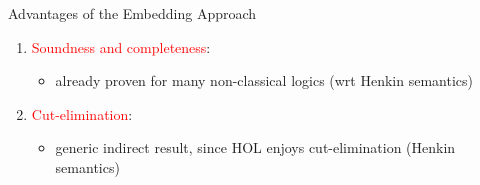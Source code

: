 \documentclass[9pt,mathserif,unknownkeysallowed,xcolor=dvipsnames]{beamer}
\begin{document}
\begin{frame}{Advantages of the Embedding Approach}
\begin{enumerate}
\begin{itemize}
  \item  possible: tactics on top of embedding, hiding of embedding
  \end{itemize}
\item \textcolor{red}{Soundness and completeness}: 
  \begin{itemize}
  \item  already proven for many non-classical logics (wrt Henkin semantics)
  \end{itemize} 
\item \textcolor{red}{Cut-elimination}:
  \begin{itemize}
  \item  generic indirect result,  since HOL enjoys cut-elimination (Henkin semantics)
  \end{itemize}
\end{enumerate}
\end{frame}
\end{document}

